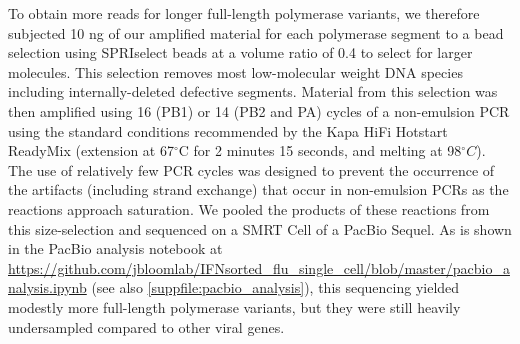 \documentclass[10pt,letterpaper]{article}
\newcommand{\SUPPFILE}[1]{\autoref{suppfile:#1}}
\begin{document}
To obtain more reads for longer full-length polymerase variants, we therefore subjected 10 ng of our amplified material for each polymerase segment to a bead selection using SPRIselect beads at a volume ratio of 0.4 to select for larger molecules. 
This selection removes most low-molecular weight DNA species including internally-deleted defective segments.
Material from this selection was then amplified using 16 (PB1) or 14 (PB2 and PA) cycles of a non-emulsion PCR using the standard conditions recommended by the Kapa HiFi Hotstart ReadyMix (extension at 67$^{\circ}$C for 2 minutes 15 seconds, and melting at 98$^{\circ}C$).
The use of relatively few PCR cycles was designed to prevent the occurrence of the artifacts (including strand exchange) that occur in non-emulsion PCRs as the reactions approach saturation.
We pooled the products of these reactions from this size-selection and sequenced on a SMRT Cell of a PacBio Sequel.
As is shown in the PacBio analysis notebook at \url{https://github.com/jbloomlab/IFNsorted_flu_single_cell/blob/master/pacbio_analysis.ipynb} (see also \SUPPFILE{pacbio_analysis}), this sequencing yielded modestly more full-length polymerase variants, but they were still heavily undersampled compared to other viral genes.
\end{document}
